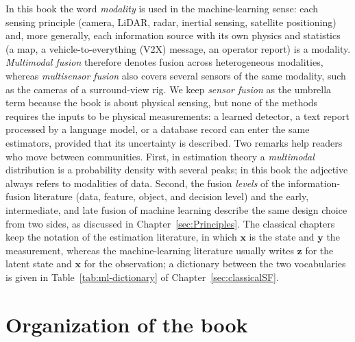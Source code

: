 \documentclass[graybox,envcountchap]{style/SNmono}
\begin{document}
In this book the word \emph{modality} is used in the machine-learning sense: each sensing principle (camera, LiDAR, radar, inertial sensing, satellite positioning) and, more generally, each information source with its own physics and statistics (a map, a vehicle-to-everything (V2X) message, an operator report) is a modality. \emph{Multimodal fusion} therefore denotes fusion across heterogeneous modalities, whereas \emph{multisensor fusion} also covers several sensors of the same modality, such as the cameras of a surround-view rig. We keep \emph{sensor fusion} as the umbrella term because the book is about physical sensing, but none of the methods requires the inputs to be physical measurements: a learned detector, a text report processed by a language model, or a database record can enter the same estimators, provided that its uncertainty is described. Two remarks help readers who move between communities. First, in estimation theory a \emph{multimodal} distribution is a probability density with several peaks; in this book the adjective always refers to modalities of data. Second, the fusion \emph{levels} of the information-fusion literature (data, feature, object, and decision level) and the early, intermediate, and late fusion of machine learning describe the same design choice from two sides, as discussed in Chapter~\ref{sec:Principles}. The classical chapters keep the notation of the estimation literature, in which $\mathbf{x}$ is the state and $\mathbf{y}$ the measurement, whereas the machine-learning literature usually writes $\mathbf{z}$ for the latent state and $\mathbf{x}$ for the observation; a dictionary between the two vocabularies is given in Table~\ref{tab:ml-dictionary} of Chapter~\ref{sec:classicalSF}.

\section{Organization of the book}
\end{document}
